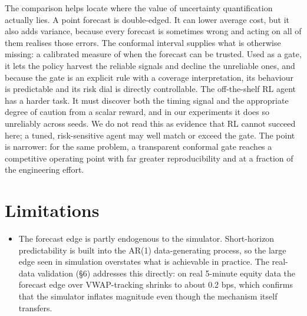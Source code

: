 The comparison helps locate where the value of uncertainty
quantification actually lies. A point forecast is double-edged. It can
lower average cost, but it also adds variance, because every forecast is
sometimes wrong and acting on all of them realises those errors. The
conformal interval supplies what is otherwise missing: a calibrated
measure of when the forecast can be trusted. Used as a gate, it lets the
policy harvest the reliable signals and decline the unreliable ones, and
because the gate is an explicit rule with a coverage interpretation, its
behaviour is predictable and its risk dial is directly controllable. The
off-the-shelf RL agent has a harder task. It must discover both the
timing signal and the appropriate degree of caution from a scalar
reward, and in our experiments it does so unreliably across seeds. We do
not read this as evidence that RL cannot succeed here; a tuned,
risk-sensitive agent may well match or exceed the gate. The point is
narrower: for the same problem, a transparent conformal gate reaches a
competitive operating point with far greater reproducibility and at a
fraction of the engineering effort.

\section{Limitations}

\begin{itemize}
\item
  The forecast edge is partly endogenous to the simulator. Short-horizon
  predictability is built into the AR(1) data-generating process, so the
  large edge seen in simulation overstates what is achievable in
  practice. The real-data validation (§6) addresses this directly: on
  real 5-minute equity data the forecast edge over VWAP-tracking shrinks
  to about 0.2 bps, which confirms that the simulator inflates magnitude
  even though the mechanism itself transfers.
\end{itemize}

